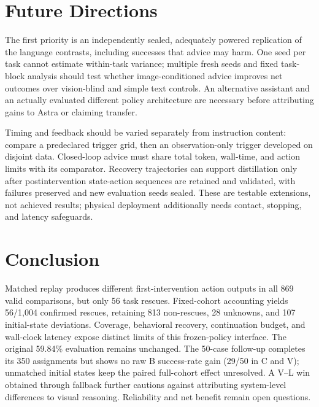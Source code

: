 \documentclass[10pt,twocolumn,letterpaper]{article}
\begin{document}
\section{Future Directions}
\label{sec:future}
The first priority is an independently sealed, adequately powered replication of the language contrasts, including successes that advice may harm. One seed per task cannot estimate within-task variance; multiple fresh seeds and fixed task-block analysis should test whether image-conditioned advice improves net outcomes over vision-blind and simple text controls. An alternative assistant and an actually evaluated different policy architecture are necessary before attributing gains to Astra or claiming transfer.

Timing and feedback should be varied separately from instruction content: compare a predeclared trigger grid, then an observation-only trigger developed on disjoint data. Closed-loop advice must share total token, wall-time, and action limits with its comparator. Recovery trajectories can support distillation only after postintervention state-action sequences are retained and validated, with failures preserved and new evaluation seeds sealed. These are testable extensions, not achieved results; physical deployment additionally needs contact, stopping, and latency safeguards.

\section{Conclusion}
Matched replay produces different first-intervention action outputs in all 869 valid comparisons, but only 56 task rescues. Fixed-cohort accounting yields 56/1,004 confirmed rescues, retaining 813 non-rescues, 28 unknowns, and 107 initial-state deviations. Coverage, behavioral recovery, continuation budget, and wall-clock latency expose distinct limits of this frozen-policy interface. The original 59.84\% evaluation remains unchanged. The 50-case follow-up completes its 350 assignments but shows no raw B success-rate gain (29/50 in C and V); unmatched initial states keep the paired full-cohort effect unresolved. A V--L win obtained through fallback further cautions against attributing system-level differences to visual reasoning. Reliability and net benefit remain open questions.

{\small}
\end{document}
